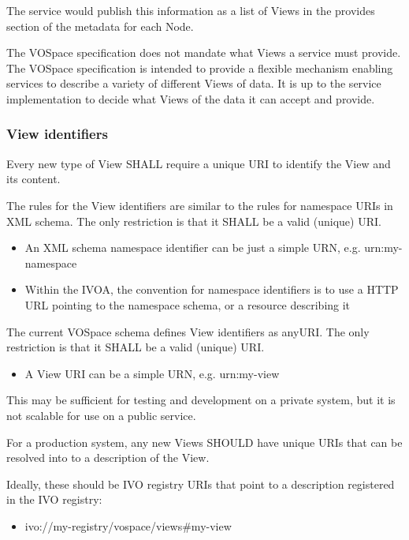 \documentclass[11pt,a4paper]{ivoa}
\begin{document}
The service would publish this information as a list of Views in the provides section of the metadata for each Node.

The VOSpace specification does not mandate what Views a service must provide. The VOSpace specification is intended to provide a flexible mechanism enabling services to describe a variety of different Views of data. It is up to the service implementation to decide what Views of the data it can accept and provide.

\subsubsection{View identifiers}
\label{subsubsec:view identifiers}
Every new type of View SHALL require a unique URI to identify the View and its content.

The rules for the View identifiers are similar to the rules for namespace URIs in XML schema. The only restriction is that it SHALL be a valid (unique) URI.

\begin{itemize}
    \item An XML schema namespace identifier can be just a simple URN, e.g. urn:my-namespace
    \item Within the IVOA, the convention for namespace identifiers is to use a HTTP URL pointing to the namespace schema, or a resource describing it
\end{itemize}

The current VOSpace schema defines View identifiers as anyURI. The only restriction is that it SHALL be a valid (unique) URI.

\begin{itemize}
    \item A View URI can be a simple URN, e.g. urn:my-view
\end{itemize}

This may be sufficient for testing and development on a private system, but it is not scalable for use on a public service.

For a production system, any new Views SHOULD have unique URIs that can be resolved into to a description of the View.

Ideally, these should be IVO registry URIs that point to a description registered in the IVO registry:

\begin{itemize}
    \item ivo://my-registry/vospace/views\#my-view
\end{itemize}
\end{document}
